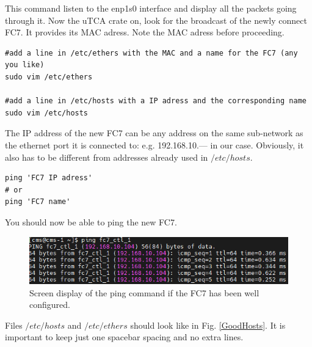 \documentclass[10pt,a4paper]{article}
\begin{document}
This command listen to the enp1s0 interface and display all the packets going through it.
Now the uTCA crate on,  look for the broadcast of the newly connect FC7. It provides its MAC  adress. Note the MAC adress before proceeding.

\begin{framed}
\begin{verbatim}
#add a line in /etc/ethers with the MAC and a name for the FC7 (any you like)
sudo vim /etc/ethers 

#add a line in /etc/hosts with a IP adress and the corresponding name
sudo vim /etc/hosts  
\end{verbatim}
\end{framed}

The IP address of the new FC7 can be any address on the same sub-network as the ethernet port it is connected to: e.g. 192.168.10.---  in our case. Obviously, it also has to be different from addresses already used in $/etc/hosts $.

\begin{framed}
\begin{verbatim}
ping 'FC7 IP adress'
# or
ping 'FC7 name'
\end{verbatim}
\end{framed}

You should now be able to ping the new FC7. 

\begin{figure}[h!]
\centering
 \includegraphics[width=0.8\linewidth]{PingResponse.png} 
  \caption{Screen display of the ping command if the FC7 has been well configured.}
  \label{GoodPing2}
\end{figure}

Files $/etc/hosts$ and $/etc/ethers$ should look like in Fig. \ref{GoodHosts}. It is important to keep just one spacebar spacing and no extra lines.
\end{document}
